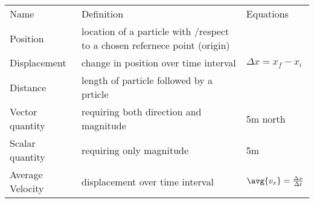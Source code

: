 \documentclass[11pt]{article}
\begin{document}
\begin{table}
	\begin{tabular}{l|ll}
		Name & Definition & Equations \\
		Position & location of a particle with \slash respect to a chosen refernece point (origin) & \\
		Displacement & change in position over time interval & $ \Delta x=x_{f} - x_{i} $ \\
		Distance & length of particle followed by a prticle & \\
		Vector quantity & requiring both direction and magnitude & 5m north \\
		Scalar quantity & requiring only magnitude & 5m \\
        Average Velocity & displacement over time interval & $ \avg{v_{x}} = \frac{ \Delta x}{ \Delta t } $ \\
	\end{tabular}
\end{table}
\end{document}

